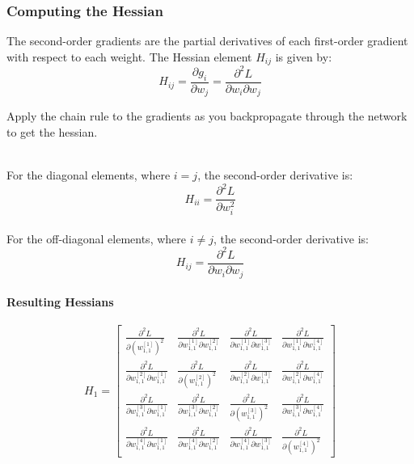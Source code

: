 \documentclass{article}
\begin{document}
\subsubsection{Computing the Hessian}

The second-order gradients are the partial derivatives of each first-order gradient with respect to each weight. The Hessian element \( H_{ij} \) is given by:
\[
H_{ij} = \frac{\partial g_i}{\partial w_j} = \frac{\partial^2 L}{\partial w_i \partial w_j}
\]

Apply the chain rule to the gradients as you backpropagate through the network to get the hessian.

\\
For the diagonal elements, where \( i = j \), the second-order derivative is:
\[
H_{ii} = \frac{\partial^2 L}{\partial w_i^2}
\]
\\
For the off-diagonal elements, where \( i \neq j \), the second-order derivative is:
\[
H_{ij} = \frac{\partial^2 L}{\partial w_i \partial w_j}
\]



\paragraph{Resulting Hessians}


\[
H_1 = \begin{bmatrix}
\frac{\partial^2 L}{\partial (w_{1,1}^{[1]})^2} & \frac{\partial^2 L}{\partial w_{1,1}^{[1]} \partial w_{1,1}^{[2]}} & \frac{\partial^2 L}{\partial w_{1,1}^{[1]} \partial w_{1,1}^{[3]}} & \frac{\partial^2 L}{\partial w_{1,1}^{[1]} \partial w_{1,1}^{[4]}} \\
\frac{\partial^2 L}{\partial w_{1,1}^{[2]} \partial w_{1,1}^{[1]}} & \frac{\partial^2 L}{\partial (w_{1,1}^{[2]})^2} & \frac{\partial^2 L}{\partial w_{1,1}^{[2]} \partial w_{1,1}^{[3]}} & \frac{\partial^2 L}{\partial w_{1,1}^{[2]} \partial w_{1,1}^{[4]}} \\
\frac{\partial^2 L}{\partial w_{1,1}^{[3]} \partial w_{1,1}^{[1]}} & \frac{\partial^2 L}{\partial w_{1,1}^{[3]} \partial w_{1,1}^{[2]}} & \frac{\partial^2 L}{\partial (w_{1,1}^{[3]})^2} & \frac{\partial^2 L}{\partial w_{1,1}^{[3]} \partial w_{1,1}^{[4]}} \\
\frac{\partial^2 L}{\partial w_{1,1}^{[4]} \partial w_{1,1}^{[1]}} & \frac{\partial^2 L}{\partial w_{1,1}^{[4]} \partial w_{1,1}^{[2]}} & \frac{\partial^2 L}{\partial w_{1,1}^{[4]} \partial w_{1,1}^{[3]}} & \frac{\partial^2 L}{\partial (w_{1,1}^{[4]})^2}
\end{bmatrix}
\]
\end{document}
